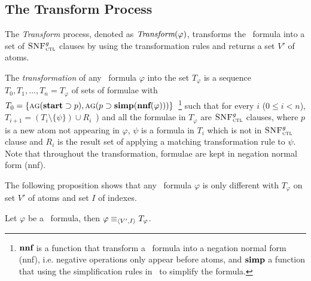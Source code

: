 \documentclass[letterpaper]{article} %
\begin{document}
\subsection{The Transform Process}
The \emph{Transform} process, denoted as $\emph{Transform}(\varphi)$, transforms the \CTL\ formula into a set of ${\textsc{SNF}_{\textsc{ctl}}^g}$ clauses by using  the transformation rules and returns a set $V'$ of atoms.

The \emph{transformation} of any \CTL\ formula $\varphi$ into the set $T_{\varphi}$ is a sequence $T_0, T_1,\dots, T_n=T_{\varphi}$ of sets of formulae with $T_0=\{\textsc{a} \textsc{g}(\textbf{start} \supset p), \textsc{a} \textsc{g}(p \supset \textbf{simp}(\textbf{nnf}(\varphi)))\}$~\footnote{$\textbf{nnf}$ is a function that transform a \CTL\ formula into a negation normal form (nnf), i.e. negative operations only appear before atoms, and $\textbf{simp}$ a function that using the simplification rules in~\cite{zhang2014resolution} to simplify the formula.} such that for every $i$ ($0 \leq i< n$), $T_{i+1} = (T_i \setminus \{\psi\}) \cup R_i$~\cite{zhang2014resolution}) and all the formulae in $T_{\varphi}$ are ${\textsc{SNF}_{\textsc{ctl}}^g}$ clauses, where $p$ is a new atom not appearing in $\varphi$, $\psi$ is a formula in $T_i$ which is not in ${\textsc{SNF}_{\textsc{ctl}}^g}$ clause and $R_i$ is the result set of applying a matching transformation rule to $\psi$. Note that throughout the transformation, formulae are kept in negation normal form (nnf).

The following proposition shows that any \CTL\ formula $\varphi$ is only different with $T_{\varphi}$ on set $V'$ of atoms and set $I$ of indexes.

\begin{proposition}\label{pro:TranE}
 Let $\varphi$ be a \CTL\ formula, then $\varphi \equiv_{{\langle{V', I}\rangle}} T_{\varphi}$.
\end{proposition}

\end{document}
